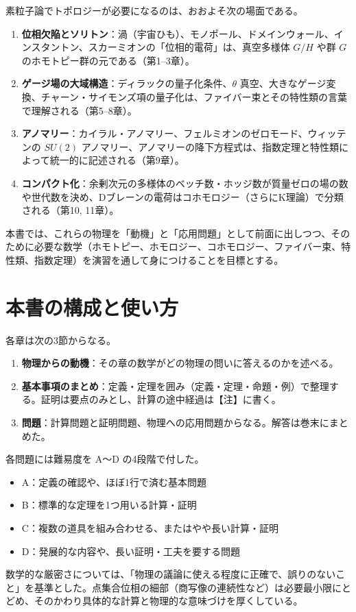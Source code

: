 素粒子論でトポロジーが必要になるのは、おおよそ次の場面である。
\begin{enumerate}
  \item \textbf{位相欠陥とソリトン}：渦（宇宙ひも）、モノポール、ドメインウォール、インスタントン、スカーミオンの「位相的電荷」は、真空多様体 $G/H$ や群 $G$ のホモトピー群の元である（第1--3章）。
  \item \textbf{ゲージ場の大域構造}：ディラックの量子化条件、$\theta$ 真空、大きなゲージ変換、チャーン・サイモンズ項の量子化は、ファイバー束とその特性類の言葉で理解される（第5--8章）。
  \item \textbf{アノマリー}：カイラル・アノマリー、フェルミオンのゼロモード、ウィッテンの $SU(2)$ アノマリー、アノマリーの降下方程式は、指数定理と特性類によって統一的に記述される（第9章）。
  \item \textbf{コンパクト化}：余剰次元の多様体のベッチ数・ホッジ数が質量ゼロの場の数や世代数を決め、Dブレーンの電荷はコホモロジー（さらにK理論）で分類される（第10, 11章）。
\end{enumerate}
本書では、これらの物理を「動機」と「応用問題」として前面に出しつつ、そのために必要な数学（ホモトピー、ホモロジー、コホモロジー、ファイバー束、特性類、指数定理）を演習を通して身につけることを目標とする。

\section*{本書の構成と使い方}
各章は次の3節からなる。
\begin{enumerate}
  \item \textbf{物理からの動機}：その章の数学がどの物理の問いに答えるのかを述べる。
  \item \textbf{基本事項のまとめ}：定義・定理を囲み（定義・定理・命題・例）で整理する。証明は要点のみとし、計算の途中経過は【注】に書く。
  \item \textbf{問題}：計算問題と証明問題、物理への応用問題からなる。解答は巻末にまとめた。
\end{enumerate}
各問題には難易度を A〜D の4段階で付した。
\begin{itemize}
  \item A：定義の確認や、ほぼ1行で済む基本問題
  \item B：標準的な定理を1つ用いる計算・証明
  \item C：複数の道具を組み合わせる、またはやや長い計算・証明
  \item D：発展的な内容や、長い証明・工夫を要する問題
\end{itemize}
数学的な厳密さについては、「物理の議論に使える程度に正確で、誤りのないこと」を基準とした。点集合位相の細部（商写像の連続性など）は必要最小限にとどめ、そのかわり具体的な計算と物理的な意味づけを厚くしている。

